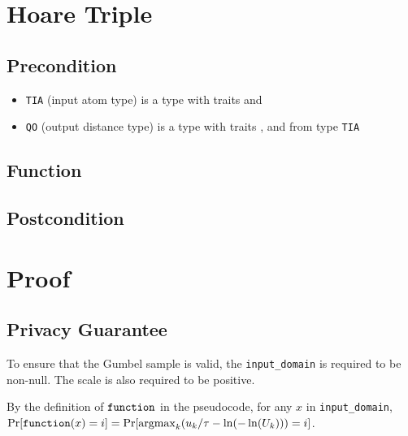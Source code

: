 \documentclass{article}
\begin{document}
\section{Hoare Triple}
\subsection*{Precondition}
\begin{itemize}
    \item \texttt{TIA} (input atom type) is a type with traits  and 

    \item \texttt{QO} (output distance type) is a type with traits ,
     and
     from type \texttt{TIA}
\end{itemize}

\subsection*{Function}
\label{sec:python-pseudocode}


\subsection*{Postcondition}


\section{Proof}
\subsection{Privacy Guarantee}

To ensure that the Gumbel sample is valid, the \texttt{input\_domain} is required to be non-null.
The scale is also required to be positive.

\begin{lemma}
    \label{function-prob}
    By the definition of $\texttt{function}$ in the pseudocode, for any $x$ in \texttt{input\_domain}, \\
    $\Pr[\texttt{function}(x) = i] = \Pr[\mathrm{argmax}_k (u_k / \tau - \ln(-\ln(U_k))) = i]$.
\end{lemma}
\end{document}
